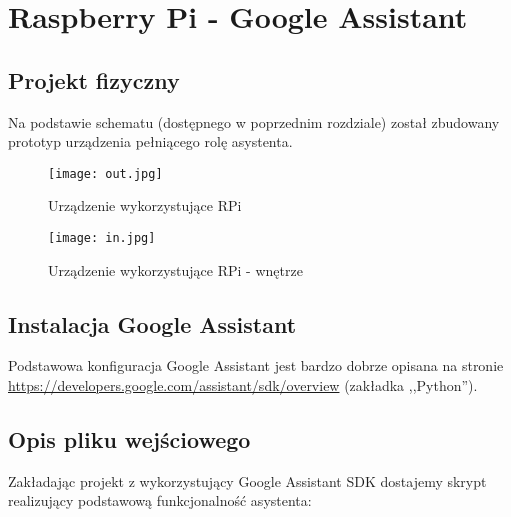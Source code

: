 \section{Raspberry Pi - Google Assistant}

\subsection{Projekt fizyczny}

Na podstawie schematu (dostępnego w poprzednim rozdziale) został zbudowany prototyp urządzenia pełniącego rolę asystenta.

	\begin{figure}[H]
	\centering
	\texttt{[image: out.jpg]}
	\caption{Urządzenie wykorzystujące RPi}
	\label{img:out}
	\end{figure}
	
	\begin{figure}[H]
		\centering
	\texttt{[image: in.jpg]}
	\caption{Urządzenie wykorzystujące RPi - wnętrze}
	\label{img:in}
	\end{figure}

\subsection{Instalacja Google Assistant}

Podstawowa konfiguracja Google Assistant jest bardzo dobrze opisana na stronie \url{https://developers.google.com/assistant/sdk/overview} (zakładka ,,Python'').

\subsection{Opis pliku wejściowego}

Zakładając projekt z wykorzystujący Google Assistant SDK dostajemy skrypt realizujący podstawową funkcjonalność asystenta:


